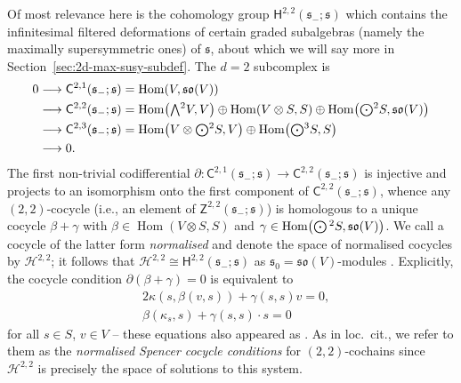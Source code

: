 \documentclass[pdftex]{sigma}
\numberwithin{equation}{section}
\newcommand{\fs}{\mathfrak{s}}
\newcommand{\fso}{\mathfrak{so}}
\newcommand{\cH}{\mathcal{H}}
\newcommand{\ssC}{\mathsf{C}}
\newcommand{\ssH}{\mathsf{H}}
\newcommand{\ssZ}{\mathsf{Z}}
\newcommand{\Wedge}{\mathchoice{{\textstyle\bigwedge}}{\bigwedge}{\bigwedge}{\bigwedge}}	%
\newcommand{\Odot}{\mathchoice{{\textstyle\bigodot}}{\bigodot}{\bigodot}{\bigodot}}
\newcommand{\1}{\mathbbm{1}}
\DeclareMathOperator{\Hom}{Hom}
\begin{document}
Of most relevance here is the cohomology group $\ssH^{2,2}(\fs_-;\fs)$ which contains the infinitesimal filtered deformations of certain graded subalgebras (namely the maximally supersymmetric ones) of $\fs$, about which we will say more in Section~\ref{sec:2d-max-susy-subdef}. The $d=2$ subcomplex is
\begin{align*}
	0 &\longrightarrow \ssC^{2,1}(\fs_-;\fs) = \Hom(V,\fso(V)) \\
	&\longrightarrow \ssC^{2,2}(\fs_-;\fs) = \Hom\bigl(\Wedge^2V,V\bigr)\oplus\Hom(V\otimes S,S)\oplus\Hom\bigl(\Odot^2S,\fso(V)\bigr)\\
	&\longrightarrow \ssC^{2,3}(\fs_-;\fs) = \Hom\bigl(V\otimes\Odot^2S,V\bigr)\oplus\Hom\bigl(\Odot^3S,S\bigr)\\
	&\longrightarrow 0.
\end{align*}
The first non-trivial codifferential $\partial\colon \ssC^{2,1}(\fs_-;\fs) \to \ssC^{2,2}(\fs_-;\fs)$ is injective and projects to an isomorphism onto the first component of $\ssC^{2,2}(\fs_-;\fs)$, whence any $(2,2)$-cocycle (i.e., an element of $\ssZ^{2,2}(\fs_-;\fs)$) is homologous to a unique cocycle $\beta+\gamma$ with $\beta\in\Hom(V\otimes S,S)$ and $\gamma\in\Hom\bigl(\Odot^2S,\fso(V)\bigr)$. We call a cocycle of the latter form \emph{normalised} and denote the space of normalised cocycles by $\cH^{2,2}$; it follows that $\cH^{2,2}\cong\ssH^{2,2}(\fs_-;\fs)$ as $\fs_0=\fso(V)$-modules \cite[Lemma~4.4]{Beckett2024_2}. Explicitly, the cocycle condition $\partial(\beta+\gamma)=0$ is equivalent to
\begin{align}
	&2\kappa(s,\beta(v,s)) + \gamma(s,s)v = 0, \label{eq:spencer-1}\\
	&\beta(\kappa_s,s) + \gamma(s,s)\cdot s = 0 \label{eq:spencer-2}
\end{align}
for all $s\in S$, $v\in V$ -- these equations also appeared as \cite[equations~(4.2) and (4.3)]{Beckett2024_2}. As in loc.\ cit., we refer to them as the \emph{normalised Spencer cocycle conditions} for $(2,2)$-cochains since $\cH^{2,2}$ is precisely the space of solutions to this system.
\end{document}
